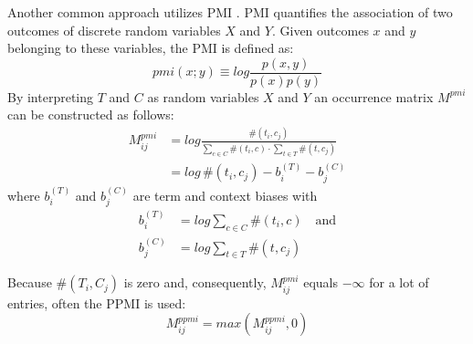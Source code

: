 Another common approach utilizes \acl{PMI} \autocite{church_word_1990}. \acf{PMI} quantifies the association of two outcomes of discrete random variables $X$ and $Y$. Given outcomes $x$ and $y$ belonging to these variables, the \ac{PMI} is defined as:
\begin{equation}
	pmi(x;y) \equiv log\frac{p(x,y)}{p(x)p(y)}
\end{equation}
By interpreting $T$ and $C$ as random variables $X$ and $Y$ an occurrence matrix $M^{pmi}$ 
can be constructed as follows:
\begin{equation}
\begin{split}
M^{pmi}_{ij} & = log\frac{\#(t_i, c_j)}{\sum\limits_{c \in C}\#(t_i, c) \cdot \sum\limits_{t \in T}\#(t,c_j)} \\
 & = log\,\#(t_i, c_j) - b_i^{(T)} - b_j^{(C)}
\end{split}
\end{equation}
where $b_i^{(T)}$ and $b_j^{(C)}$ are term and context biases with
\begin{equation} \label{eq:m_pmi}
\begin{split}
b_i^{(T)} & = log \sum\limits_{c \in C}\#(t_i, c) \quad \text{and} \\
b_j^{(C)} & = log \sum\limits_{t \in T}\#(t,c_j)
\end{split}
\end{equation}

Because $\#(T_i, C_j)$ is zero and, consequently, $M^{pmi}_{ij}$ equals $-\infty$ for a lot of entries, often the \ac{PPMI} \autocite{niwa_co-occurrence_1994} is used:
\begin{equation}
M^{ppmi}_{ij} = max(M^{ppmi}_{ij}, 0)
\end{equation}

